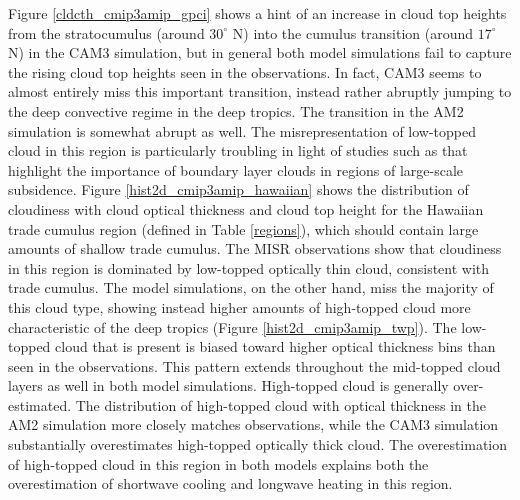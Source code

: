 Figure \ref{cldcth_cmip3amip_gpci} shows a hint of an increase in cloud top heights from the stratocumulus (around $30^{\circ}$ N) into the cumulus transition (around $17^{\circ}$ N) in the CAM3 simulation, but in general both model simulations fail to capture the rising cloud top heights seen in the observations. In fact, CAM3 seems to almost entirely miss this important transition, instead rather abruptly jumping to the deep convective regime in the deep tropics. The transition in the AM2 simulation is somewhat abrupt as well. The misrepresentation of low-topped cloud in this region is particularly troubling in light of studies such as \cite{bony_and_dufresne_2005} that highlight the importance of boundary layer clouds in regions of large-scale subsidence. Figure \ref{hist2d_cmip3amip_hawaiian} shows the distribution of cloudiness with cloud optical thickness and cloud top height for the Hawaiian trade cumulus region (defined in Table \ref{regions}), which should contain large amounts of shallow trade cumulus. The MISR observations show that cloudiness in this region is dominated by low-topped optically thin cloud, consistent with trade cumulus. The model simulations, on the other hand, miss the majority of this cloud type, showing instead higher amounts of high-topped cloud more characteristic of the deep tropics (Figure \ref{hist2d_cmip3amip_twp}). The low-topped cloud that is present is biased toward higher optical thickness bins than seen in the observations. This pattern extends throughout the mid-topped cloud layers as well in both model simulations. High-topped cloud is generally over-estimated. The distribution of high-topped cloud with optical thickness in the AM2 simulation more closely matches observations, while the CAM3 simulation substantially overestimates high-topped optically thick cloud. The overestimation of high-topped cloud in this region in both models explains both the overestimation of shortwave cooling and longwave heating in this region.
